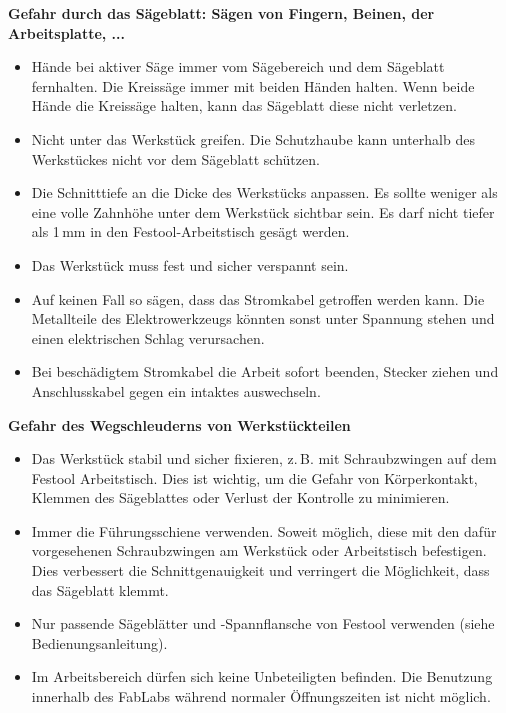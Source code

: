 \documentclass{\basedir/fablab-document}
\begin{document}
\textbf{Gefahr durch das Sägeblatt: Sägen von Fingern, Beinen, der Arbeitsplatte, ...}
\begin{itemize}
\item Hände bei aktiver Säge immer vom Sägebereich und dem Sägeblatt fernhalten. Die Kreissäge immer mit beiden Händen halten. Wenn beide Hände die Kreissäge halten, kann das Sägeblatt diese nicht verletzen.

\item Nicht unter das Werkstück greifen. Die Schutzhaube kann unterhalb des Werkstückes nicht vor dem Sägeblatt schützen.

\item Die Schnitttiefe an die Dicke des Werkstücks anpassen. Es sollte weniger als eine volle Zahnhöhe unter dem Werkstück sichtbar sein. Es darf nicht tiefer als 1\,mm in den Festool-Arbeitstisch gesägt werden.

\item Das Werkstück muss fest und sicher verspannt sein.

\item Auf keinen Fall so sägen, dass das Stromkabel getroffen werden kann. Die Metallteile des Elektrowerkzeugs könnten sonst unter Spannung stehen und einen elektrischen Schlag verursachen.

\item Bei beschädigtem Stromkabel die Arbeit sofort beenden, Stecker ziehen und Anschlusskabel gegen ein intaktes auswechseln.
\end{itemize}

\textbf{Gefahr des Wegschleuderns von Werkstückteilen}
\begin{itemize}
\item Das Werkstück stabil und sicher fixieren, z.\,B. mit Schraubzwingen auf dem Festool Arbeitstisch. Dies ist wichtig,
um die Gefahr von Körperkontakt, Klemmen des Sägeblattes oder Verlust der Kontrolle zu minimieren.

\item Immer die Führungsschiene verwenden. Soweit möglich, diese mit den dafür vorgesehenen Schraubzwingen am Werkstück oder Arbeitstisch befestigen. Dies verbessert die Schnittgenauigkeit und verringert die Möglichkeit, dass das Sägeblatt klemmt.

\item Nur passende Sägeblätter und -Spannflansche von Festool verwenden (siehe Bedienungsanleitung).

\item Im Arbeitsbereich dürfen sich keine Unbeteiligten befinden. Die Benutzung innerhalb des FabLabs während normaler Öffnungszeiten ist nicht möglich.
\end{itemize}
\end{document}
